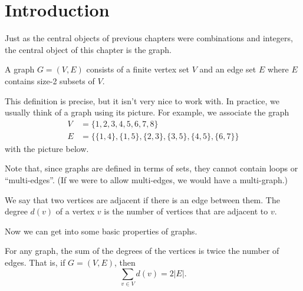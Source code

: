 \documentclass[../m55main.tex]{chapters}
\begin{document}
\section{Introduction}
Just as the central objects of previous chapters were combinations and integers, the central object of this chapter is the graph.

\begin{definition}[Graph]
    A graph $G = (V,E)$ consists of a finite vertex set $V$ and an edge set $E$ where $E$ contains size-2 subsets of $V$.
\end{definition}

This definition is precise, but it isn't very nice to work with.
In practice, we usually think of a graph using its picture.
For example, we associate the graph
\begin{align*}
    V &= \{ 1, 2, 3, 4, 5, 6, 7, 8 \} \\
    E &= \Big\{ \{ 1,4 \}, \{ 1,5 \}, \{ 2,3 \}, \{ 3,5 \}, \{ 4,5 \}, \{ 6,7 \} \Big\}
\end{align*}
with the picture below.

\begin{center}
\end{center}

Note that, since graphs are defined in terms of sets, they cannot contain loops or ``multi-edges''.
(If we were to allow multi-edges, we would have a multi-graph.)

We say that two vertices are adjacent if there is an edge between them.
The degree $d(v)$ of a vertex $v$ is the number of vertices that are adjacent to $v$.

Now we can get into some basic properties of graphs.

\begin{lemma}
    For any graph, the sum of the degrees of the vertices is twice the number of edges.
    That is, if $G = (V,E)$, then
    \[ \sum_{v \in V} d(v) = 2 |E|. \]
\end{lemma}
\end{document}
